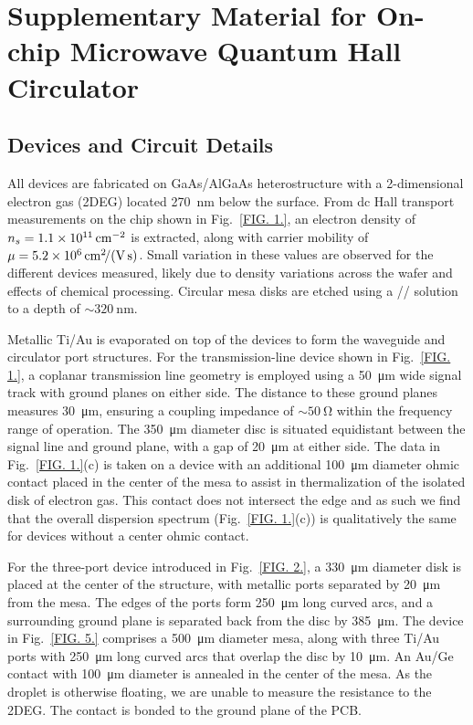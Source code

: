 \chapter{Supplementary Material for On-chip Microwave Quantum Hall Circulator}
\section{Devices and Circuit Details}
\label{sec:qhe_det}
All devices are fabricated on GaAs/AlGaAs heterostructure with a 2-dimensional electron gas (2DEG) located \SI{270}{\nano\meter} below the surface. From dc Hall transport measurements on the chip shown in Fig.~\ref{FIG. 1.}, an electron density of $n_s = \SI{1.1e11}{\per\square\centi\meter}$ is extracted, along with carrier mobility of $\mu = \mob{5.2e6}$. Small variation in these values are observed for the different devices measured, likely due to density variations across the wafer and effects of chemical processing. Circular mesa disks are etched using a // solution to a depth of $\sim \SI{320}{\nano\meter}$.

Metallic Ti/Au is evaporated on top of the devices to form the waveguide and circulator port structures. For the transmission-line device shown in Fig.~\ref{FIG. 1.}, a coplanar transmission line geometry is employed using a \SI{50}{\micro\meter} wide signal track with ground planes on either side. The distance to these ground planes measures \SI{30}{\micro\meter}, ensuring a coupling impedance of $\sim \SI{50}{\ohm}$ within the frequency range of operation. The \SI{350}{\micro\meter} diameter disc is situated equidistant between the signal line and ground plane, with a gap of \SI{20}{\micro\meter} at either side. The data in Fig.~\ref{FIG. 1.}(c) is taken on a device with an additional \SI{100}{\micro\meter} diameter ohmic contact placed in the center of the mesa to assist in thermalization of the isolated disk of electron gas. This contact does not intersect the edge and as such we find that the overall dispersion spectrum (Fig.~\ref{FIG. 1.}(c)) is qualitatively the same for devices without a center ohmic contact.

For the three-port device introduced in Fig.~\ref{FIG. 2.}, a \SI{330}{\micro\meter} diameter disk is placed at the center of the structure, with metallic ports separated by \SI{20}{\micro\meter} from the mesa. The edges of the ports form \SI{250}{\micro\meter} long curved arcs, and a surrounding ground plane is separated back from the disc by \SI{385}{\micro\meter}. The device in Fig.~\ref{FIG. 5.} comprises a \SI{500}{\micro\meter} diameter mesa, along with three Ti/Au ports with \SI{250}{\micro\meter} long curved arcs that overlap the disc by \SI{10}{\micro\meter}. An Au/Ge contact with \SI{100}{\micro\meter} diameter is annealed in the center of the mesa. As the droplet is otherwise floating, we are unable to measure the resistance to the 2DEG. The contact is bonded to the ground plane of the PCB.

